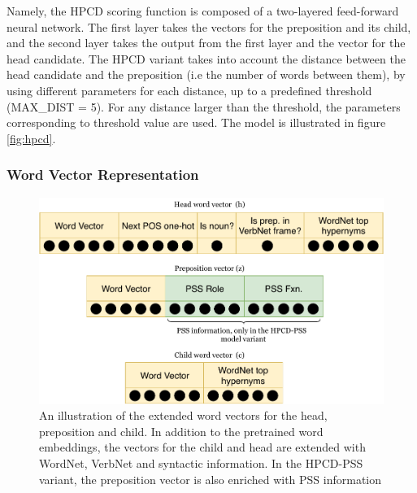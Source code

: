 Namely, the HPCD scoring function is composed of a two-layered feed-forward neural network. The first layer takes the vectors for the preposition and its child, and the second layer takes the output from the first layer and the vector for the head candidate. The HPCD variant takes into account the distance between the head candidate and the preposition (i.e the number of words between them), by using different parameters for each distance, up to a predefined threshold (MAX\_DIST = 5). For any distance larger than the threshold, the parameters corresponding to threshold value are used. The model is illustrated in figure \ref{fig:hpcd}.
\\
\tocless\subsubsection{Word Vector Representation} \label{section:hpcd_wordvectors}

\begin{figure}
    \centering
    \includegraphics[width=\textwidth]{Figures/hpcd_vec.pdf}
    \caption{An illustration of the extended word vectors for the head, preposition and child. In addition to the pretrained word embeddings, the vectors for the child and head are extended with WordNet, VerbNet and syntactic information. In the HPCD-PSS variant, the preposition vector is also enriched with PSS information}
    \label{fig:hpcdvectors}
\end{figure}

